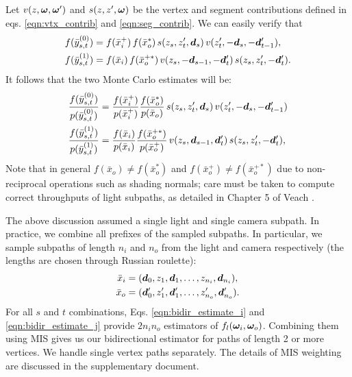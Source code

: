 Let $v(z, \bm{\omega}, \bm{\omega}')$ and $s(z, z', \bm{\omega})$ be the vertex and segment contributions defined in eqs. \eqref{eqn:vtx_contrib} and \eqref{eqn:seg_contrib}.
We can easily verify that
\begin{align}
	f(\bar{y}_{s,t}^{(0)}) &= f(\bar{x}_i^+) \, f(\bar{x}_o^*) \, s(z_s, z'_t, \bm{d}_s) \, v(z'_t, -\bm{d}_s, -\bm{d}'_{t - 1}),\\
	f(\bar{y}_{s,t}^{(1)}) &= f(\bar{x}_i) \, f(\bar{x}_o^{+*}) \, v(z_s, -\bm{d}_{s - 1}, -\bm{d}'_t) \, s(z_s, z'_t, -\bm{d}'_t).
\end{align}
It follows that the two Monte Carlo estimates will be:
\begin{align}
	\label{eqn:bidir_estimate_i}
	\frac{f(\bar{y}^{(0)}_{s, t})}{p(\bar{y}^{(0)}_{s, t})} &=
	\frac{f(\bar{x}_i^+)}{p(\bar{x}_i^+)}
	\frac{f(\bar{x}_o^*)}{p(\bar{x}_o)}
	\, s(z_s, z'_t, \bm{d}_s) \, v(z'_t, -\bm{d}_s, -\bm{d}'_{t - 1})\\
	\label{eqn:bidir_estimate_j}
	\frac{f(\bar{y}^{(1)}_{s, t})}{p(\bar{y}^{(1)}_{s, t})} &=
	\frac{f(\bar{x}_i)}{p(\bar{x}_i)}
	\frac{f(\bar{x}_o^{+*})}{p(\bar{x}_o^+)}
	\, v(z_s, \bm{d}_{s - 1}, \bm{d}'_t) \, s(z_s, z'_t, -\bm{d}'_t),
\end{align}
Note that in general $f(\bar x_o) \neq f(\bar x_o^*)$ and $f(\bar x_o^+) \neq f(\bar x_o^{+*})$ due to non-reciprocal operations such as shading normals; care must be taken to compute correct throughputs of light subpaths, as detailed in Chapter 5 of Veach \cite{veach1997robust}.

The above discussion assumed a single light and single camera subpath. In practice, we combine all prefixes of the sampled subpaths. In particular, we sample subpaths of length $n_i$ and $n_o$ from the light and camera respectively (the lengths are chosen through Russian roulette):
\begin{equation}
	\begin{aligned}
	\bar{x}_i &= (\bm{d}_0, z_1, \bm{d}_1, \ldots, z_{n_i}, \bm{d}_{n_i}),\\
	\bar{x}_o &= (\bm{d}'_0, z'_1, \bm{d}'_1, \ldots, z'_{n_o}, \bm{d}'_{n_o}).
	\end{aligned}
\end{equation}
For all $s$ and $t$ combinations, Eqs. \eqref{eqn:bidir_estimate_i} and \eqref{eqn:bidir_estimate_j} provide $2 n_i n_o$ estimators of $f_l(\bm{\omega}_i, \bm{\omega}_o)$.
Combining them using MIS gives us our bidirectional estimator for paths of length 2 or more vertices. We handle single vertex paths separately. The details of MIS weighting are discussed in the supplementary document.


